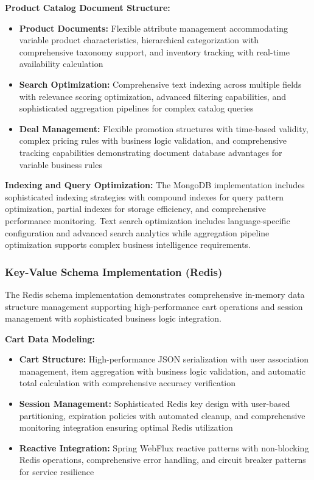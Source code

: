 \textbf{Product Catalog Document Structure:}
\begin{itemize}
\item \textbf{Product Documents:} Flexible attribute management accommodating variable product characteristics, hierarchical categorization with comprehensive taxonomy support, and inventory tracking with real-time availability calculation
\item \textbf{Search Optimization:} Comprehensive text indexing across multiple fields with relevance scoring optimization, advanced filtering capabilities, and sophisticated aggregation pipelines for complex catalog queries
\item \textbf{Deal Management:} Flexible promotion structures with time-based validity, complex pricing rules with business logic validation, and comprehensive tracking capabilities demonstrating document database advantages for variable business rules
\end{itemize}

\textbf{Indexing and Query Optimization:}
The MongoDB implementation includes sophisticated indexing strategies with compound indexes for query pattern optimization, partial indexes for storage efficiency, and comprehensive performance monitoring. Text search optimization includes language-specific configuration and advanced search analytics while aggregation pipeline optimization supports complex business intelligence requirements.

\subsubsection{Key-Value Schema Implementation (Redis)}

The Redis schema implementation demonstrates comprehensive in-memory data structure management supporting high-performance cart operations and session management with sophisticated business logic integration.

\textbf{Cart Data Modeling:}
\begin{itemize}
\item \textbf{Cart Structure:} High-performance JSON serialization with user association management, item aggregation with business logic validation, and automatic total calculation with comprehensive accuracy verification
\item \textbf{Session Management:} Sophisticated Redis key design with user-based partitioning, expiration policies with automated cleanup, and comprehensive monitoring integration ensuring optimal Redis utilization
\item \textbf{Reactive Integration:} Spring WebFlux reactive patterns with non-blocking Redis operations, comprehensive error handling, and circuit breaker patterns for service resilience
\end{itemize}

